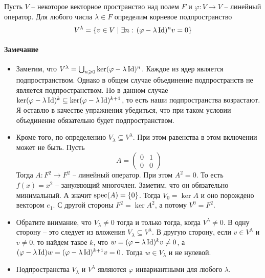 \begin{definition}
Пусть $V$ -- некоторое векторное пространство над полем $F$ и $\varphi \colon V\to V$ -- линейный оператор. Для любого числа $\lambda \in F$ определим корневое подпространство
\[
V^\lambda = \{v\in V\mid \exists n:\,(\varphi - \lambda\operatorname{Id})^n v = 0\}
\]
\end{definition}

\paragraph{Замечание}

\begin{itemize}
\item Заметим, что  $V^\lambda=\bigcup_{n\geqslant 0}\ker (\varphi - \lambda \operatorname{Id})^n$. Каждое из ядер является подпространством. Однако в общем случае объединение подпространств не является подпространством. Но в данном случае $\ker(\varphi - \lambda \operatorname{Id})^k\subseteq \ker(\varphi-\lambda \operatorname{Id})^{k+1}$, то есть наши подпространства возрастают. Я оставлю в качестве упражнения убедиться, что при таком условии объединение обязательно будет подпространством. 
 
\item Кроме того, по определению $V_\lambda \subseteq V^\lambda$. При этом равенства в этом включении может не быть. Пусть 
\[
A = 
\begin{pmatrix}
{0}&{1}\\
{0}&{0}
\end{pmatrix}
\]
Тогда $A\colon F^2\to F^2$ -- линейный оператор. При этом $A^2 = 0$. То есть $f(x) = x^2$ -- зануляющий многочлен. Заметим, что он обязательно минимальный. А значит $\operatorname{spec}(A) = \{0\}$. Тогда $V_0 = \ker A$ и оно порождено вектором $e_1$. С другой стороны $F^2 = \ker A^2$, а потому $V^0 = F^2$.

\item Обратите внимание, что $V_\lambda \neq 0$ тогда и только тогда, когда $V^\lambda\neq 0$. В одну сторону -- это следует из вложения $V_\lambda\subseteq V^\lambda$. В другую сторону, если $v\in V^\lambda$ и $v\neq 0$, то найдем такое $k$, что $w =(\varphi - \lambda\operatorname{Id})^k v \neq 0 $, а $(\varphi - \lambda \operatorname{Id})w = (\varphi - \lambda\operatorname{Id})^{k+1}v =0$. Тогда $w\in V_\lambda$ и не нулевой.

\item Подпространства $V_\lambda$ и $V^\lambda$ являются $\varphi$ инвариантными для любого $\lambda$. 
\end{itemize}


